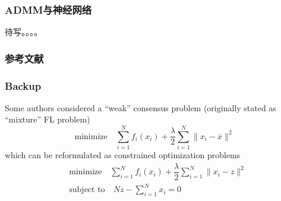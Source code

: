 
\begin{frame}
\frametitle{ADMM与神经网络}

待写。。。。

\end{frame}


\begin{frame}[allowframebreaks]
\frametitle{参考文献}

{\footnotesize


}

\end{frame}


\begin{frame}


\end{frame}


\begin{frame}
\frametitle{Backup}

Some authors considered a {\color{red} ``weak'' consensus problem} (originally stated as ``mixture'' FL problem)
$$\text{minimize} \quad \sum\limits_{i=1}^N f_i(x_i) + \dfrac{\lambda}{2} \sum\limits_{i=1}^N \lVert x_i - \overline{x} \rVert^2$$
which can be reformulated as constrained optimization problems
\begin{align*}
    & \text{minimize} \quad \sum\limits_{i=1}^N f_i(x_i) + \dfrac{\lambda}{2} \sum\limits_{i=1}^N \lVert x_i - z \rVert^2 \\
    & \text{subject to} \quad Nz - \sum\limits_{i=1}^N x_i = 0
\end{align*}

\end{frame}


